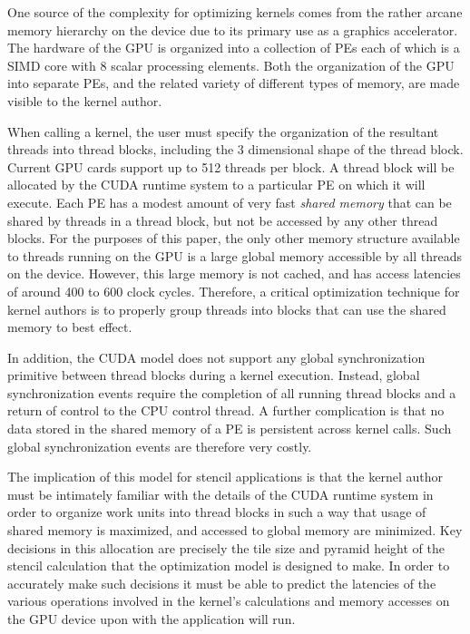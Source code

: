 \documentclass{styles/sig-alternate}
\begin{document}
One source of the complexity for optimizing kernels comes from the rather
arcane memory hierarchy on the device due to its primary use as a graphics
accelerator.  The hardware of the GPU is organized into a collection of PEs
each of which is a SIMD core with 8 scalar processing elements.  Both the 
organization of the GPU into separate PEs, and the related variety of
different types of memory, are made visible to the kernel author.

When calling a kernel, the user must specify the organization of the
resultant threads into thread blocks, including the 3 dimensional shape
of the thread block.  Current GPU cards support up to 512 threads per
block.  A thread block will be allocated by the CUDA runtime system
to a particular PE on which it will execute.  Each PE has a modest amount
of very fast {\em shared memory} that can be shared by threads in a thread block, but
not be accessed by any other thread blocks.  For the purposes of this paper,
the only other memory structure available to threads running on the GPU is
a large global memory accessible by all threads on the device.  However, this
large memory is not cached, and has access latencies of around 400 to 600 clock
cycles.  Therefore, a critical optimization technique for kernel authors is to
properly group threads into blocks that can use the shared memory to best effect.

In addition, the CUDA model does not support any global synchronization primitive
between thread blocks during a kernel execution.  Instead, global synchronization
events require the completion of all running thread blocks and a return of control to 
the CPU control thread.  A further complication is that no data stored in the 
shared memory of a PE is persistent across kernel calls.
Such global synchronization events are therefore very costly.

The implication of this model for stencil applications is that the kernel
author must be intimately familiar with the details of the CUDA runtime
system in order to organize work units into thread blocks in such a way
that usage of shared memory is maximized, and accessed to global memory
are minimized.  Key decisions in this allocation are precisely the
tile size and pyramid height of the stencil calculation that the optimization
model is designed to make.  In order to accurately make such decisions it must
be able to predict the latencies of the various operations involved in the kernel's
calculations and memory accesses on the GPU device upon with the application will run.
\end{document}
